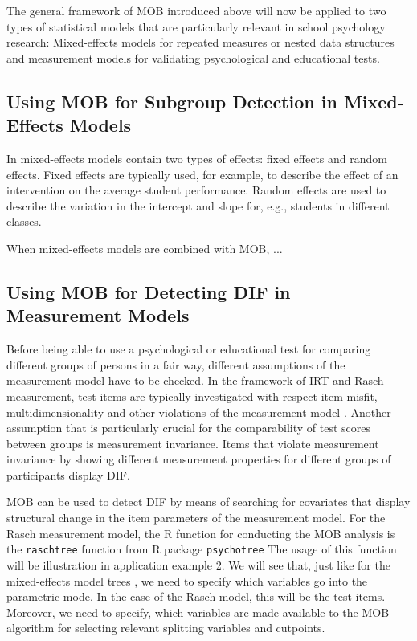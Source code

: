 \documentclass[doc,floatsintext,natbib]{apa7}
\begin{document}
The general framework of MOB introduced above will now be applied to two types of statistical models that are particularly relevant in school psychology research: Mixed-effects models for repeated measures or nested data structures and measurement models for validating psychological and educational tests. 

\subsection{Using MOB for Subgroup Detection in Mixed-Effects Models}

In mixed-effects models contain two types of effects: fixed effects and random effects. Fixed effects are typically used, for example, to describe the effect of an intervention on the average student performance. Random effects are used to describe the variation in the intercept and slope for, e.g., students in different classes. 

When mixed-effects models are combined with MOB, ...


\subsection{Using MOB for Detecting DIF in Measurement Models}

Before being able to use a psychological or educational test for comparing different groups of persons in a fair way, different assumptions of the measurement model have to be checked. In the framework of IRT and Rasch measurement, test items are typically investigated with respect item misfit, multidimensionality and other violations of the measurement model \citep[cf., e.g.,][for an introduction]{DebStrZei:2022:CRC}. Another assumption that is particularly crucial for the comparability of test scores between groups is measurement invariance. Items that violate measurement invariance by showing different measurement properties for different groups of participants display DIF.

MOB can be used to detect DIF by means of searching for covariates that display structural change in the item parameters of the measurement model. For the Rasch measurement model, the R function for conducting the MOB analysis is the \texttt{raschtree} function from R package \texttt{psychotree} \citep{StroyKopf15}  The usage of this function will be illustration in application example 2. We will see that, just like for the mixed-effects model trees , we need to specify which variables go into the parametric mode. In the case of the Rasch model, this will be the test items. Moreover, we need to specify, which variables are made available to the MOB algorithm for selecting relevant splitting variables and cutpoints. 
\end{document}
